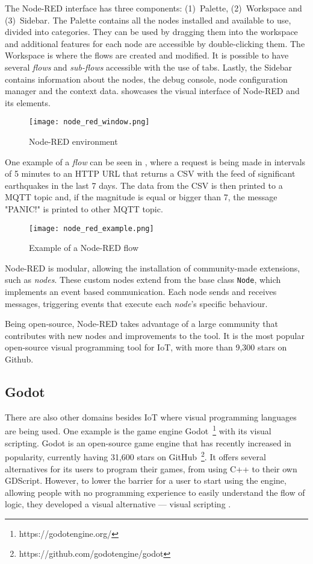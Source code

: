 The Node-RED interface has three components: (1)~Palette, (2)~Workspace and (3)~Sidebar. The Palette contains all the nodes installed and available to use, divided into categories. They can be used by dragging them into the workspace and additional features for each node are accessible by double-clicking them. The Workspace is where the flows are created and modified. It is possible to have several \emph{flows} and \emph{sub-flows} accessible with the use of tabs. Lastly, the Sidebar contains information about the nodes, the debug console, node configuration manager and the context data.  showcases the visual interface of Node-RED and its elements.

\begin{figure}[h]
\centering
\texttt{[image: node\_red\_window.png]}
\caption{Node-RED environment}
\label{fig:node_red_window}
\end{figure}

One example of a \emph{flow} can be seen in , where a request is being made in intervals of 5 minutes to an HTTP URL that returns a CSV with the feed of significant earthquakes in the last 7 days. The data from the CSV is then printed to a MQTT topic and, if the magnitude is equal or bigger than 7, the message "PANIC!" is printed to other MQTT topic. 

\begin{figure}[!ht]
\centering
\texttt{[image: node\_red\_example.png]}
\caption{Example of a Node-RED flow}
\label{fig:node_red_example}
\end{figure}

Node-RED is modular, allowing the installation of community-made extensions, such as \textit{nodes}. These custom nodes extend from the base class \texttt{Node}, which implements an event based communication. Each node sends and receives messages, triggering events that execute each \textit{node}'s specific behaviour.

Being open-source, Node-RED takes advantage of a large community that contributes with new nodes and improvements to the tool. It is the most popular open-source visual programming tool for IoT, with more than 9,300 stars on Github.

\subsection{Godot}\label{sec:godot}

There are also other domains besides IoT where visual programming languages are being used. One example is the game engine Godot~\footnote{https://godotengine.org/} with its visual scripting. Godot is an open-source game engine that has recently increased in popularity, currently having 31,600 stars on GitHub~\footnote{https://github.com/godotengine/godot}. It offers several alternatives for its users to program their games, from using C++ to their own GDScript. However, to lower the barrier for a user to start using the engine, allowing people with no programming experience to easily understand the flow of logic, they developed a visual alternative --- visual scripting .

